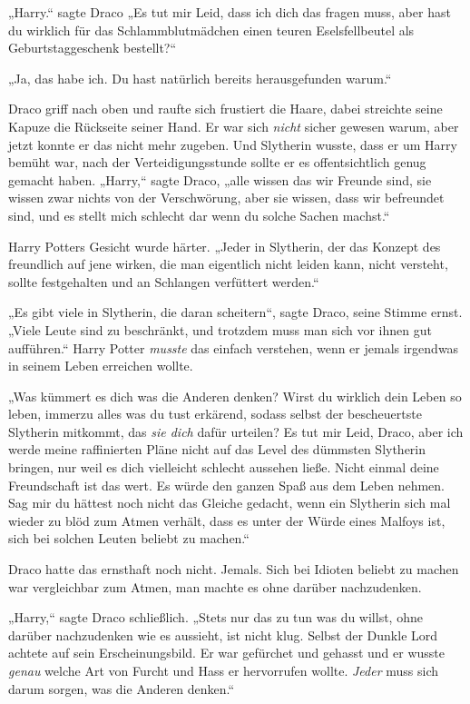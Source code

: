 {„Harry.“ sagte Draco „Es tut mir Leid, dass ich dich das fragen muss, aber hast du wirklich für das Schlammblutmädchen einen teuren Eselsfellbeutel als Geburtstaggeschenk bestellt?“

„Ja, das habe ich. Du hast natürlich bereits herausgefunden warum.“

Draco griff nach oben und raufte sich frustiert die Haare, dabei streichte seine Kapuze die Rückseite seiner Hand. Er war sich \emph{nicht} sicher gewesen warum, aber jetzt konnte er das nicht mehr zugeben. Und Slytherin wusste, dass er um Harry bemüht war, nach der Verteidigungsstunde sollte er es offentsichtlich genug gemacht haben. „Harry,“ sagte Draco, „alle wissen das wir Freunde sind, sie wissen zwar nichts von der Verschwörung, aber sie wissen, dass wir befreundet sind, und es stellt mich schlecht dar wenn du solche Sachen machst.“

Harry Potters Gesicht wurde härter. „Jeder in Slytherin, der das Konzept des freundlich auf jene wirken, die man eigentlich nicht leiden kann, nicht versteht, sollte festgehalten und an Schlangen verfüttert werden.“

„Es gibt viele in Slytherin, die daran scheitern“, sagte Draco, seine Stimme ernst. „Viele Leute sind zu beschränkt, und trotzdem muss man sich vor ihnen gut aufführen.“ Harry Potter \emph{musste} das einfach verstehen, wenn er jemals irgendwas in seinem Leben erreichen wollte.

„Was kümmert es dich was die Anderen denken? Wirst du wirklich dein Leben so leben, immerzu alles was du tust erkärend, sodass selbst der bescheuertste Slytherin mitkommt, das \emph{sie dich} dafür urteilen? Es tut mir Leid, Draco, aber ich werde meine raffinierten Pläne nicht auf das Level des dümmsten Slytherin bringen, nur weil es dich vielleicht schlecht aussehen ließe. Nicht einmal deine Freundschaft ist das wert. Es würde den ganzen Spaß aus dem Leben nehmen. Sag mir du hättest noch nicht das Gleiche gedacht, wenn ein Slytherin sich mal wieder zu blöd zum Atmen verhält, dass es unter der Würde eines Malfoys ist, sich bei solchen Leuten beliebt zu machen.“

Draco hatte das ernsthaft noch nicht. Jemals. Sich bei Idioten beliebt zu machen war vergleichbar zum Atmen, man machte es ohne darüber nachzudenken.

„Harry,“ sagte Draco schließlich. „Stets nur das zu tun was du willst, ohne darüber nachzudenken wie es aussieht, ist nicht klug. Selbst der Dunkle Lord achtete auf sein Erscheinungsbild. Er war gefürchet und gehasst und er wusste \emph{genau} welche Art von Furcht und Hass er hervorrufen wollte. \emph{Jeder} muss sich darum sorgen, was die Anderen denken.“

}
